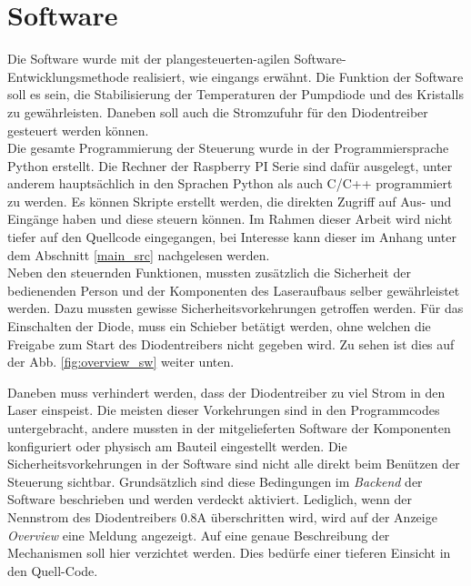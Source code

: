 \section{Software}
\label{chptr:software}
Die Software wurde mit der plangesteuerten-agilen Software-Entwicklungsmethode realisiert, wie eingangs erwähnt. 
Die Funktion der Software soll es sein, die Stabilisierung der Temperaturen der Pumpdiode und des Kristalls zu gewährleisten. Daneben soll auch die Stromzufuhr für den Diodentreiber gesteuert werden können.\\
Die gesamte Programmierung der Steuerung wurde in der Programmiersprache Python erstellt. Die Rechner der Raspberry PI Serie sind dafür ausgelegt, unter anderem hauptsächlich in den Sprachen Python als auch C/C++ programmiert zu werden. Es können Skripte erstellt werden, die direkten Zugriff auf Aus- und Eingänge haben und diese steuern können. Im Rahmen dieser Arbeit wird nicht tiefer auf den Quellcode eingegangen, bei Interesse kann dieser im Anhang unter dem Abschnitt \ref{main_src} nachgelesen werden.\\

Neben den steuernden Funktionen, mussten zusätzlich die Sicherheit der bedienenden Person und der Komponenten des Laseraufbaus selber gewährleistet werden. Dazu mussten gewisse Sicherheitsvorkehrungen getroffen werden. Für das Einschalten der Diode, muss ein Schieber betätigt werden, ohne welchen die Freigabe zum Start des Diodentreibers nicht gegeben wird. Zu sehen ist dies auf der Abb. \ref{fig:overview_sw} weiter unten.

Daneben muss verhindert werden, dass der Diodentreiber zu viel Strom in den Laser einspeist. Die meisten dieser Vorkehrungen sind in den Programmcodes untergebracht, andere mussten in der mitgelieferten Software der Komponenten konfiguriert oder physisch am Bauteil eingestellt werden. Die Sicherheitsvorkehrungen in der Software sind nicht alle direkt beim Benützen der Steuerung sichtbar. Grundsätzlich sind diese Bedingungen im \textit{Backend} der Software beschrieben und werden verdeckt aktiviert. Lediglich, wenn der Nennstrom des Diodentreibers 0.8A überschritten wird, wird auf der Anzeige \textit{Overview} eine Meldung angezeigt. Auf eine genaue Beschreibung der Mechanismen soll hier verzichtet werden. Dies bedürfe einer tieferen Einsicht in den Quell-Code.\\

